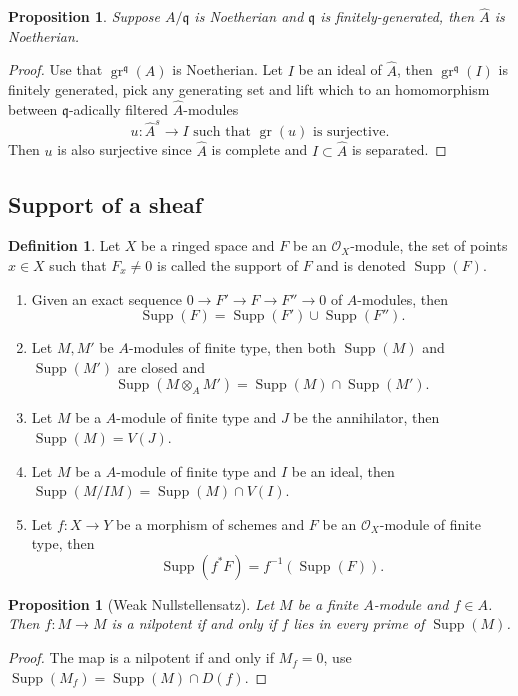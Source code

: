 \documentclass[leqno]{amsart}
\DeclareMathOperator{\gr}{gr}
\DeclareMathOperator{\Supp}{Supp}
\newcommand{\1}{\mathbf{1}}
\newcommand{\fm}{\mathfrak m}
\newcommand{\fq}{\mathfrak q}
\newtheorem{prop}[thm]{Proposition}
\theoremstyle{definition}
\newtheorem{defn}[thm]{Definition}
\theoremstyle{remark}
\begin{document}
\begin{prop}
	Suppose $A/\fq$ is Noetherian and $\fq$ is finitely-generated,
	then $\hat{A}$ is Noetherian.
\end{prop}
\begin{proof}
	Use that $\gr^{\fq}(A)$ is Noetherian.
	Let $I$ be an ideal of $ \hat{A}$,
	then $\gr^{\fq}(I)$ is finitely generated, 
	pick any generating set and lift which to an homomorphism
	between $\fq$-adically filtered $ \hat{A}$-modules
	 \[
		u\colon \hat{A}^{s}\to I
		\text{ such that } \gr(u) \text{ is surjective.}
	\]
	Then $u$ is also surjective since  $ \hat{A}$ is complete
	and $I\subset \hat{A}$ is separated.
\end{proof}

\subsection{Support of a sheaf}
\begin{defn}
	Let $X$ be a ringed space and 
	$F$ be an $\mathcal{O}_{X}$-module,
	the set of points $x\in X$ such that $F_x\neq 0$
	is called the support of $F$ and is denoted  $\Supp(F)$.
\end{defn}
\begin{enumerate}[label=(\alph*)]
	\item 
	Given an exact sequence $0\to F'\to F\to F''\to 0$
	of $A$-modules, then
	\[
		\Supp(F)=\Supp(F')\cup \Supp(F'').
	\]
	\item
	Let $M,M'$ be  $A$-modules of finite type, then
	both $\Supp(M)$ and $\Supp(M')$ are closed and
	\[
		\Supp(M\otimes_AM')=\Supp(M)\cap \Supp(M').
	\]
	\item
	Let $M$ be a $A$-module of finite type and 
	$J$ be the annihilator, then  $\Supp(M)=V(J)$.
	\item
	Let $M$ be a $A$-module of finite type and $I$ be an ideal,
	then $\Supp(M/IM)=\Supp(M)\cap V(I)$.
	\item
	Let $f\colon X\to Y$ be a morphism of schemes
	and  $F$ be an $\mathcal{O}_X$-module of finite type, then
	\[\Supp(f^*F)=f^{-1}(\Supp(F)).\]
\end{enumerate}
\begin{prop}[Weak Nullstellensatz]
	Let $M$ be a finite $A$-module and $f\in A$.
	Then $f\colon M\to M$ is a nilpotent if and only if 
	$f$ lies in every prime of $\Supp(M)$.
\end{prop}
\begin{proof}
	The map is a nilpotent if and only if $M_f=0$,
	use $\Supp(M_f)=\Supp(M)\cap D(f)$.
\end{proof}
\end{document}
